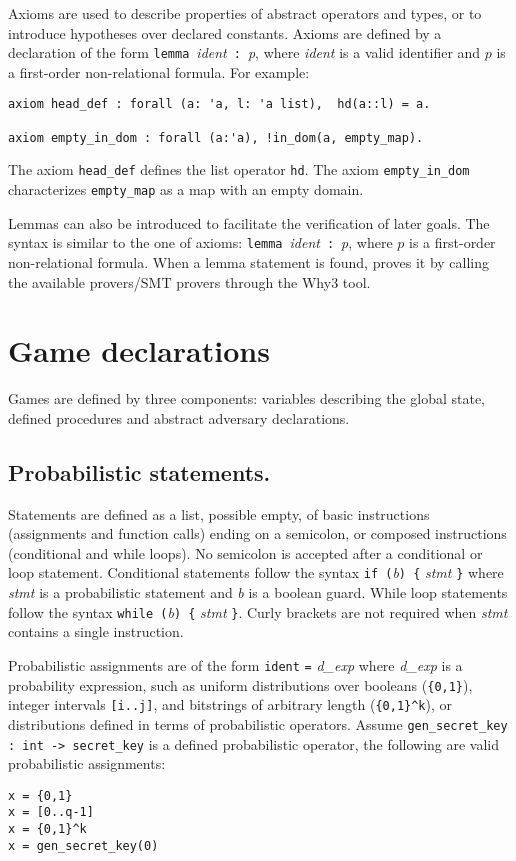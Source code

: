 Axioms are used to describe properties of abstract operators and
types, or to introduce hypotheses over declared constants. Axioms are
defined by a declaration of the form
\verb+lemma+~\textit{ident}~\verb+:+~\textit{p}, where \textit{ident}
is a valid identifier and $p$ is a first-order non-relational formula.
For example:
\begin{verbatim}
axiom head_def : forall (a: 'a, l: 'a list),  hd(a::l) = a.

axiom empty_in_dom : forall (a:'a), !in_dom(a, empty_map).
\end{verbatim}
%
The axiom \verb+head_def+ defines the list operator \verb+hd+. 
The axiom \verb+empty_in_dom+ characterizes \verb+empty_map+ as a
map with an empty domain.

Lemmas can also be introduced to facilitate the verification of later
goals. The syntax is similar to the one of axioms:
\verb+lemma+~\textit{ident}~\verb+:+~\textit{p}, where $p$ is a
first-order non-relational formula. 
%
When a lemma statement is found, \EasyCrypt proves it by calling the
available provers/SMT provers through the Why3 tool.


\section{Game declarations}
Games are defined by three components: variables describing the global
state, defined procedures and abstract adversary declarations.


\subsection{Probabilistic statements.}

Statements are defined as a list, possible empty, of basic
instructions (assignments and function calls) ending on a semicolon,
or composed instructions (conditional and while loops). No semicolon
is accepted after a conditional or loop
statement. Conditional statements follow the syntax 
%
\verb+if (+\textit{b}\verb+) {+ \textit{stmt} \verb+}+ where \textit{stmt} is
a probabilistic statement and \textit{b} is a boolean guard.  While
loop statements follow the syntax \verb+while (+\textit{b}\verb+) {+
  \textit{stmt} \verb+}+. Curly brackets are not required when
\textit{stmt} contains a single instruction.

Probabilistic assignments are of the form 
%
\verb+ident+ \verb+=+ \textit{d_exp}
%
where \textit{d_exp} is a probability expression, such as uniform
distributions over booleans (\verb+{0,1}+), integer intervals
\verb+[i..j]+, and bitstrings of arbitrary length
(\verb+{0,1}^k+), or distributions defined in terms of probabilistic
operators.  Assume \verb|gen_secret_key : int -> secret_key| is a
defined probabilistic operator, the following are valid probabilistic
assignments:
\begin{verbatim}
x = {0,1}
x = [0..q-1]
x = {0,1}^k
x = gen_secret_key(0)
\end{verbatim}



